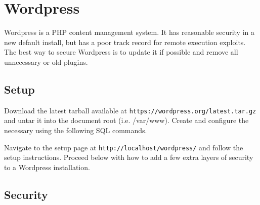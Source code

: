 \section{Wordpress}

Wordpress is a PHP content management system. It has reasonable security in a new default install, but has a poor track record for remote execution exploits. The best way to secure Wordpress is to update it if possible and remove all unnecessary or old plugins.

\subsection{Setup}

Download the latest tarball available at \lstinline|https://wordpress.org/latest.tar.gz| and untar it into the document root (i.e. /var/www). Create and configure the necessary using the following SQL commands.


Navigate to the setup page at \lstinline|http://localhost/wordpress/| and follow the setup instructions. Proceed below with how to add a few extra layers of security to a Wordpress installation.

\subsection{Security}

